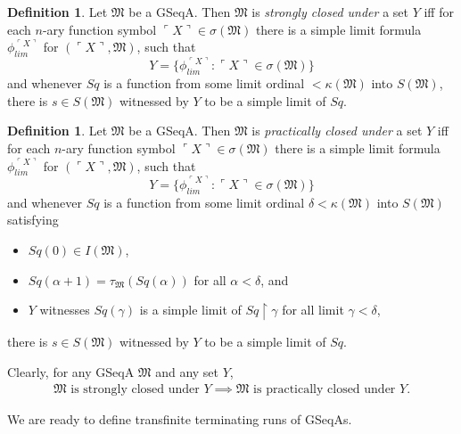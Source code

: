 \documentclass[12pt, twoside]{memoir}
\numberwithin{equation}{section}
\theoremstyle{definition}
\newtheorem{defi}[thm]{Definition}
\theoremstyle{remark}
\theoremstyle{definition}
\theoremstyle{definition}
\theoremstyle{definition}
\theoremstyle{remark}
\begin{document}
\begin{defi}\label{def237}
Let $\mathfrak{M}$ be a GSeqA. Then $\mathfrak{M}$ is \emph{strongly closed under} a set $Y$ iff for each $n$-ary function symbol $\ulcorner X \urcorner \in \sigma(\mathfrak{M})$ there is a simple limit formula $\phi_{lim}^{\ulcorner X \urcorner}$ for $(\ulcorner X \urcorner, \mathfrak{M})$, such that 
\begin{equation*}
    Y = \{\phi_{lim}^{\ulcorner X \urcorner} : \ulcorner X \urcorner \in \sigma(\mathfrak{M})\}
\end{equation*}
and whenever $Sq$ is a function from some limit ordinal $< \kappa(\mathfrak{M})$ into $S(\mathfrak{M})$, there is $s \in S(\mathfrak{M})$ witnessed by $Y$ to be a simple limit of $Sq$.
\end{defi}

\begin{defi}\label{def238}
Let $\mathfrak{M}$ be a GSeqA. Then $\mathfrak{M}$ is \emph{practically closed under} a set $Y$ iff for each $n$-ary function symbol $\ulcorner X \urcorner \in \sigma(\mathfrak{M})$ there is a simple limit formula $\phi_{lim}^{\ulcorner X \urcorner}$ for $(\ulcorner X \urcorner, \mathfrak{M})$, such that 
\begin{equation*}
    Y = \{\phi_{lim}^{\ulcorner X \urcorner} : \ulcorner X \urcorner \in \sigma(\mathfrak{M})\}
\end{equation*}
and whenever $Sq$ is a function from some limit ordinal $\delta < \kappa(\mathfrak{M})$ into $S(\mathfrak{M})$ satisfying
\begin{itemize}
    \item $Sq(0) \in I(\mathfrak{M})$,
    \item $Sq(\alpha + 1) = \tau_{\mathfrak{M}}(Sq(\alpha))$ for all $\alpha < \delta$, and
    \item $Y$ witnesses $Sq(\gamma)$ is a simple limit of $Sq \restriction \gamma$ for all limit $\gamma < \delta$,
\end{itemize}
there is $s \in S(\mathfrak{M})$ witnessed by $Y$ to be a simple limit of $Sq$.
\end{defi}

Clearly, for any GSeqA $\mathfrak{M}$ and any set $Y$,
\begin{align*}
    \mathfrak{M} \text{ is strongly closed under } Y \implies \mathfrak{M} \text{ is practically closed under } Y \text{.}
\end{align*}

We are ready to define transfinite terminating runs of GSeqAs.
\end{document}
